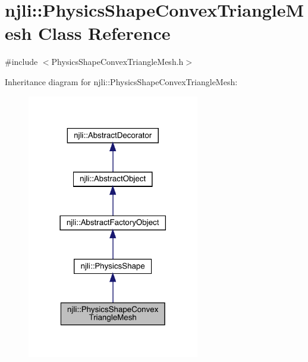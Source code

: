 \hypertarget{classnjli_1_1_physics_shape_convex_triangle_mesh}{}\section{njli\+:\+:Physics\+Shape\+Convex\+Triangle\+Mesh Class Reference}
\label{classnjli_1_1_physics_shape_convex_triangle_mesh}


{\ttfamily \#include $<$Physics\+Shape\+Convex\+Triangle\+Mesh.\+h$>$}



Inheritance diagram for njli\+:\+:Physics\+Shape\+Convex\+Triangle\+Mesh\+:\nopagebreak
\begin{figure}[H]
\begin{center}
\leavevmode
\includegraphics[width=213pt]{classnjli_1_1_physics_shape_convex_triangle_mesh__inherit__graph}
\end{center}
\end{figure}


